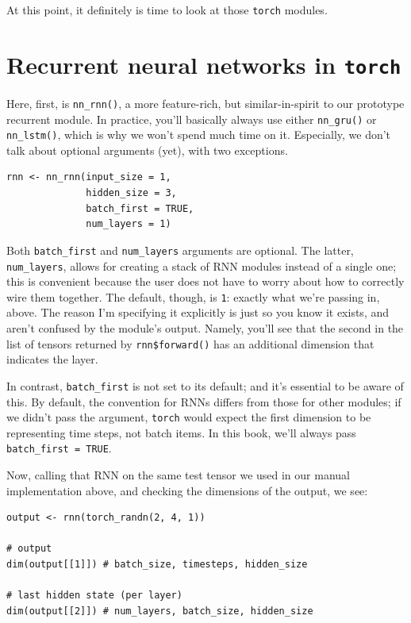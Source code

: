 \documentclass[
  letterpaper,
]{krantz}
\begin{document}
At this point, it definitely is time to look at those \texttt{torch}
modules.

\hypertarget{recurrent-neural-networks-in-torch}{%
\section{\texorpdfstring{Recurrent neural networks in
\texttt{torch}}{Recurrent neural networks in torch}}\label{recurrent-neural-networks-in-torch}}

Here, first, is \texttt{nn\_rnn()}, a more feature-rich, but
similar-in-spirit to our prototype recurrent module. In practice, you'll
basically always use either \texttt{nn\_gru()} or \texttt{nn\_lstm()},
which is why we won't spend much time on it. Especially, we don't talk
about optional arguments (yet), with two exceptions.

\begin{verbatim}
rnn <- nn_rnn(input_size = 1, 
              hidden_size = 3, 
              batch_first = TRUE,
              num_layers = 1)
\end{verbatim}

Both \texttt{batch\_first} and \texttt{num\_layers} arguments are
optional. The latter, \texttt{num\_layers}, allows for creating a stack
of RNN modules instead of a single one; this is convenient because the
user does not have to worry about how to correctly wire them together.
The default, though, is \texttt{1}: exactly what we're passing in,
above. The reason I'm specifying it explicitly is just so you know it
exists, and aren't confused by the module's output. Namely, you'll see
that the second in the list of tensors returned by
\texttt{rnn\$forward()} has an additional dimension that indicates the
layer.

In contrast, \texttt{batch\_first} is not set to its default; and it's
essential to be aware of this. By default, the convention for RNNs
differs from those for other modules; if we didn't pass the argument,
\texttt{torch} would expect the first dimension to be representing time
steps, not batch items. In this book, we'll always pass
\texttt{batch\_first\ =\ TRUE}.

Now, calling that RNN on the same test tensor we used in our manual
implementation above, and checking the dimensions of the output, we see:

\begin{verbatim}
output <- rnn(torch_randn(2, 4, 1))

# output
dim(output[[1]]) # batch_size, timesteps, hidden_size

# last hidden state (per layer)
dim(output[[2]]) # num_layers, batch_size, hidden_size
\end{verbatim}
\end{document}
